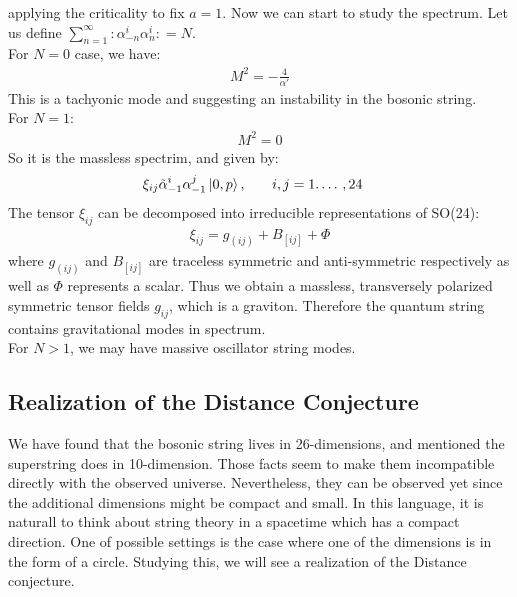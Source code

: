 applying the criticality to fix $a=1$. Now we can start to study the spectrum. Let us define $\sum_{n=1} ^{\infty} :\alpha _{-n}^{i} \alpha_{n}^{i}: = N$. \\
For $N=0$ case, we have:
\begin{align}
    M^{2}= -\frac{4}{\alpha'}
\end{align}
This is a tachyonic mode and suggesting an instability in the bosonic string. \\
For $N= 1$:
\begin{align}
    M^{2}=0
\end{align}
So it is the massless spectrim, and given by:
\begin{align}
    \xi _{ij} \tilde{\alpha}_{-1}^{i} \alpha_{-1}^{j} \ket{0,p}, & \qq{} i,j=1.\dotso ,24
\end{align} 
The tensor $\xi_{ij}$ can be decomposed into irreducible representations of SO(24):
\begin{align}
    \xi _{ij} = g_{(ij)} + B_{[ij]} + \Phi
\end{align}
where $g_{(ij)}$ and $B_{[ij]}$ are traceless symmetric and anti-symmetric respectively as well as $\Phi$ represents a scalar. Thus we obtain a massless, transversely polarized symmetric tensor fields $g_{ij}$, which is a graviton. Therefore the quantum string contains gravitational modes in spectrum. \\
For $N>1$, we may have massive oscillator string modes.

\subsection{Realization of the Distance Conjecture}
We have found that the bosonic string lives in 26-dimensions, and mentioned the superstring does in 10-dimension. Those facts seem to make them incompatible directly with the observed universe. Nevertheless, they can be observed yet since the additional dimensions might be compact and small. In this language, it is naturall to think about string theory in a spacetime which has a compact direction. One of possible settings is the case where one of the dimensions is in the form of a circle. Studying this, we will see a realization of the Distance conjecture.

